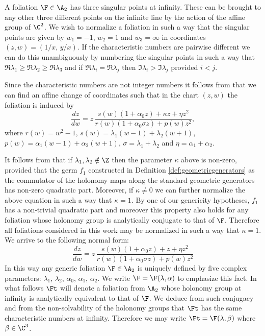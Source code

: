 


A foliation $\F\in\A_2$ has three singular points at infinity. These can be brought to any other three different points on the infinite line by the action of the affine group of $\C^2$. We wish to normalize a foliation in such a way that the singular points are given by $w_1=-1$, $w_2=1$ and $w_3=\infty$ in coordinates $(z,w)=(1/x,\,y/x)$. If the characteristic numbers are pairwise different we can do this unambiguously by numbering the singular points in such a way that $\Re{\lambda_1}\geq\Re{\lambda_2}\geq\Re{\lambda_3}$ and if $\Re{\lambda_i}=\Re{\lambda_j}$ then $\Im{\lambda_i}>\Im{\lambda_j}$ provided $i<j$. 

Since the characteristic numbers are not integer numbers it follows from \cite{Pyartli2000} that we can find an affine change of coordinates such that in the chart $(z,w)$ the foliation is induced by 
\[ \frac{dz}{dw}=z\,\frac{s(w)(1+\alpha_0 z)+\kappa z+\eta z^2}{r(w)(1+\alpha_0\sigma z)+p(w)z^2}, \]
where $r(w)=w^2-1$, $s(w)=\lambda_1(w-1)+\lambda_2(w+1)$, $p(w)=\alpha_1(w-1)+\alpha_2(w+1)$, $\sigma=\lambda_1+\lambda_2$ and $\eta=\alpha_1+\alpha_2$.

It follows from \cite{Pyartli2006} that if $\lambda_1,\lambda_2\notin\Z$ then the parameter $\kappa$ above is non-zero, provided that the germ $f_1$ constructed in Definition \ref{def:geometricgenerators} as the commutator of the holonomy maps along the standard geometric generators has non-zero quadratic part. Moreover, if $\kappa\neq 0$ we can further normalize the above equation in such a way that $\kappa=1$. By one of our genericity hypotheses, $f_1$ has a non-trivial quadratic part and moreover this property also holds for any foliation whose holonomy group is analytically conjugate to that of $\F$. Therefore all foliations considered in this work may be normalized in such a way that $\kappa=1$. We arrive to the following normal form:
\begin{equation}\label{eq:normalform}
 \frac{dz}{dw}=z\,\frac{s(w)(1+\alpha_0 z)+z+\eta z^2}{r(w)(1+\alpha_0\sigma z)+p(w)z^2}
\end{equation}
In this way any generic foliation $\F\in\A_2$ is uniquely defined by five complex parameters: $\lambda_1$, $\lambda_2$, $\alpha_0$, $\alpha_1$, $\alpha_2$. We write $\F=\F(\lambda,\alpha)$ to emphasize this fact. In what follows $\Ft$ will denote a foliation from $\A_2$ whose holonomy group at infinity is analytically equivalent to that of $\F$. We deduce from such conjugacy and from the non-solvability of the holonomy groups that $\Ft$ has the same characteristic numbers at infinity. Therefore we may write $\Ft=\F(\lambda,\beta)$ where $\beta\in\C^3$.

